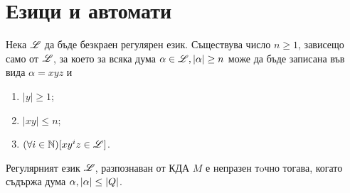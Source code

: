 \chapter{Езици и автомати}

\begin{lemma}
  Нека $\mathscr{L}$ да бъде безкраен регулярен език.
  Съществува число $n\geq 1$, зависещо само от $\mathscr{L}$, 
  за което за всяка дума $\alpha\in \mathscr{L}, \vert{\alpha}\vert\geq n$ може да 
  бъде записана във вида $\alpha = xyz$ и 
  \begin{enumerate}
  \item
    $|y|\geq 1$;
  \item
    $|xy|\leq n$;
  \item
    $(\forall i\in\mathbb{N})[xy^iz \in \mathscr{L}]$.
  \end{enumerate}
\end{lemma}

\begin{crl}
  Регулярният език $\mathscr{L}$, 
  разпознаван от КДА $M$ е непразен тoчно тогава, когато съдържа дума $\alpha, \vert{\alpha}\vert \leq \vert{Q}\vert$.
\end{crl}


